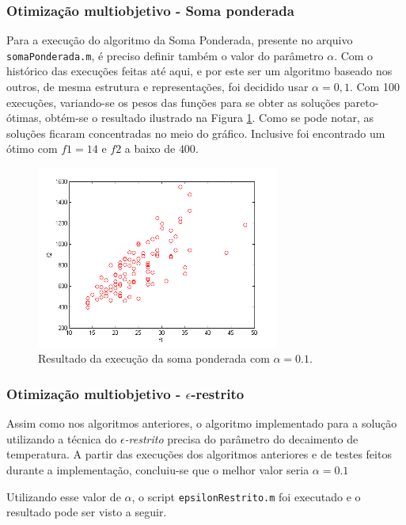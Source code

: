 \documentclass[conference]{IEEEtran}
\begin{document}
\subsubsection{Otimização multiobjetivo - Soma ponderada}
Para a execução do algoritmo da Soma Ponderada, presente no arquivo \texttt{somaPonderada.m}, é preciso definir também o valor do parâmetro $\alpha$. Com o histórico das execuções feitas até aqui, e por este ser um algoritmo baseado nos outros, de mesma estrutura e representações, foi decidido usar $\alpha = 0,1$. Com 100 execuções, variando-se os pesos das funções para se obter as soluções pareto-ótimas, obtém-se o resultado ilustrado na Figura \ref{fig:result-sp}. Como se pode notar, as soluções ficaram concentradas no meio do gráfico. Inclusive foi encontrado um ótimo com $f1 = 14$ e $f2$ a baixo de $400$.

	\begin{figure}[h]
		\centering
		\includegraphics[width=8cm]{img/result-sp.png}
		\caption{Resultado da execução da soma ponderada com $\alpha = 0.1$.}
		\label{fig:result-sp}
	\end{figure}


\subsubsection{Otimização multiobjetivo - $\epsilon$-restrito}
Assim como nos algoritmos anteriores, o algoritmo implementado para a solução utilizando a técnica do \emph{$\epsilon$-restrito} precisa do parâmetro do decaimento de temperatura. A partir das execuções dos algoritmos anteriores e de testes feitos durante a implementação, concluiu-se que o melhor valor seria $\alpha = 0.1$

Utilizando esse valor de $\alpha$, o script \texttt{epsilonRestrito.m} foi executado e o resultado pode ser visto a seguir.
\end{document}
